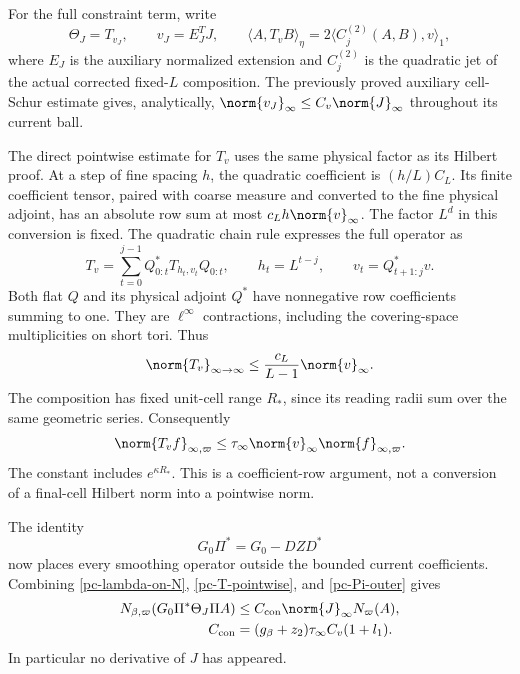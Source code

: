 For the full constraint term, write
\begin{equation}\label{pc-constraint-weight}
 \Theta_J=T_{v_J},\qquad v_J=E_J^T J,
 \qquad
 \langle A,T_vB\rangle_\eta
      =2\langle C_j^{(2)}(A,B),v\rangle_1,
\end{equation}
where $E_J$ is the auxiliary normalized extension and $C_j^{(2)}$
is the quadratic jet of the actual corrected fixed-$L$ composition.
The previously proved auxiliary cell-Schur estimate gives, analytically,
$\norm{v_J}_\infty\le C_v\norm{J}_\infty$ throughout its current ball.

The direct pointwise estimate for $T_v$ uses the same physical
factor as its Hilbert proof. At a step of fine spacing $h$, the
quadratic coefficient is $(h/L)C_L$. Its finite coefficient tensor,
paired with coarse measure and converted to the fine physical
adjoint, has an absolute row sum at most $c_Lh\norm{v}_\infty$.
The factor $L^d$ in this conversion is fixed. The quadratic chain
rule expresses the full operator as
\begin{equation}\label{pc-pointwise-chain}
 T_v=\sum_{t=0}^{j-1}Q_{0:t}^*T_{h_t,v_t}Q_{0:t},\qquad
 h_t=L^{t-j},\qquad v_t=Q_{t+1:j}^*v.
\end{equation}
Both flat $Q$ and its physical adjoint $Q^*$ have nonnegative row
coefficients summing to one. They are $\ell^\infty$ contractions,
including the covering-space multiplicities on short tori. Thus
\[
 \norm{T_v}_{\infty\to\infty}
       \le\frac{c_L}{L-1}\norm{v}_\infty.
\]
The composition has fixed unit-cell range $R_*$, since its reading
radii sum over the same geometric series. Consequently
\begin{equation}\label{pc-T-pointwise}
 \norm{T_vf}_{\infty,\varpi}
       \le\tau_\infty\norm{v}_\infty
                         \norm{f}_{\infty,\varpi}.
\end{equation}
The constant includes $e^{\kappa R_*}$. This is a coefficient-row
argument, not a conversion of a final-cell Hilbert norm into a
pointwise norm.

The identity
\begin{equation}\label{pc-Pi-outer}
 G_0\Pi^*=G_0-DZD^*
\end{equation}
now places every smoothing operator outside the bounded current
coefficients. Combining \eqref{pc-lambda-on-N},
\eqref{pc-T-pointwise}, and \eqref{pc-Pi-outer} gives
\begin{align}
 N_{\beta,\varpi}(G_0\Pi^*\Theta_J\Pi A)
       &\le C_{\rm con}\norm{J}_\infty N_\varpi(A),
       \label{pc-constraint-N-bound}\\
 C_{\rm con}&=(g_\beta+z_2)\tau_\infty C_v(1+l_1).
       \notag
\end{align}
In particular no derivative of $J$ has appeared.

